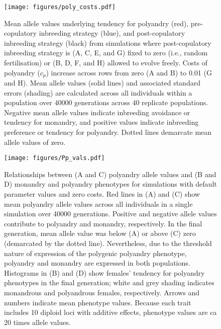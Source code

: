 \documentclass[12pt]{article}
\begin{document}
\clearpage
\begin{figure}
\begin{center}				
\texttt{[image: figures/poly\_costs.pdf]}
\end{center}
\caption{Mean allele values underlying tendency for polyandry (red), pre-copulatory inbreeding strategy (blue), and post-copulatory inbreeding strategy (black) from simulations where post-copulatory inbreeding strategy is (A, C, E, and G) fixed to zero (i.e., random fertilisation) or (B, D, F, and H) allowed to evolve freely. Costs of polyandry ($c_p$) increase across rows from zero (A and B) to 0.01 (G and H). Mean allele values (solid lines) and associated standard errors (shading) are calculated across all individuals within a population over 40000 generations across 40 replicate populations. Negative mean allele values indicate inbreeding avoidance or tendency for monandry, and positive values indicate inbreeding preference or tendency for polyandry. Dotted lines demarcate mean allele values of zero.}
\end{figure}

\clearpage
\begin{figure}
\begin{center}				
\texttt{[image: figures/Pp\_vals.pdf]}
\end{center}
\caption{Relationships between (A and C) polyandry allele values and (B and D) monandry and polyandry phenotypes for simulations with default parameter values and zero costs. Red lines in (A) and (C) show mean polyandry allele values across all individuals in a single simulation over 40000 generations. Positive and negative allele values contribute to polyandry and monandry, respectively. In the final generation, mean allele value was below (A) or above (C) zero (demarcated by the dotted line). Nevertheless, due to the threshold nature of expression of the polygenic polyandry phenotype, polyandry and monandry are expressed in both populations. Histograms in (B) and (D) show females' tendency for polyandry phenotypes in the final generation; white and grey shading indicates monandrous and polyandrous females, respectively. Arrows and numbers indicate mean phenotype values. Because each trait includes 10 diploid loci with additive effects, phenotype values are ca 20 times allele values.}
\end{figure}
\end{document}
